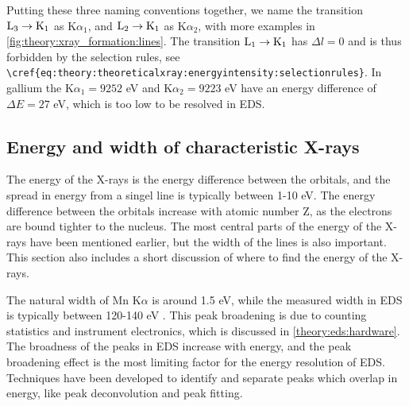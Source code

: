 Putting these three naming conventions together, we name the transition $\textnormal{L}_3 \rightarrow \textnormal{K}_1$ as K$\alpha_1$, and $\textnormal{L}_2 \rightarrow \textnormal{K}_1$ as K$\alpha_2$, with more examples in \cref{fig:theory:xray_formation:lines}.
The transition $\textnormal{L}_1 \rightarrow \textnormal{K}_1$ has $\Delta l = 0$ and is thus forbidden by the selection rules, see \verb|\cref{eq:theory:theoreticalxray:energyintensity:selectionrules}|.
In gallium the K$\alpha_1 = 9252$ eV and K$\alpha_2 = 9223$ eV \cite{thompson_x-ray_2004} have an energy difference of $\Delta E = 27$ eV, which is too low to be resolved in EDS.




\subsection{Energy and width of characteristic X-rays}
\label{theory:xray_formation:energy}


The energy of the X-rays is the energy difference between the orbitals, and the spread in energy from a singel line is typically between 1-10 eV.
The energy difference between the orbitals increase with atomic number Z, as the electrons are bound tighter to the nucleus.
The most central parts of the energy of the X-rays have been mentioned earlier, but the width of the lines is also important.
This section also includes a short discussion of where to find the energy of the X-rays.

The natural width of Mn K$\alpha$ is around 1.5 eV, while the measured width in EDS is typically between 120-140 eV \cite[Ch. 16.1.1]{goldstein_scanning_2018}.
This peak broadening is due to counting statistics and instrument electronics, which is discussed in \cref{theory:eds:hardware}.
The broadness of the peaks in EDS increase with energy, and the peak broadening effect is the most limiting factor for the energy resolution of EDS.
Techniques have been developed to identify and separate peaks which overlap in energy, like peak deconvolution and peak fitting.




